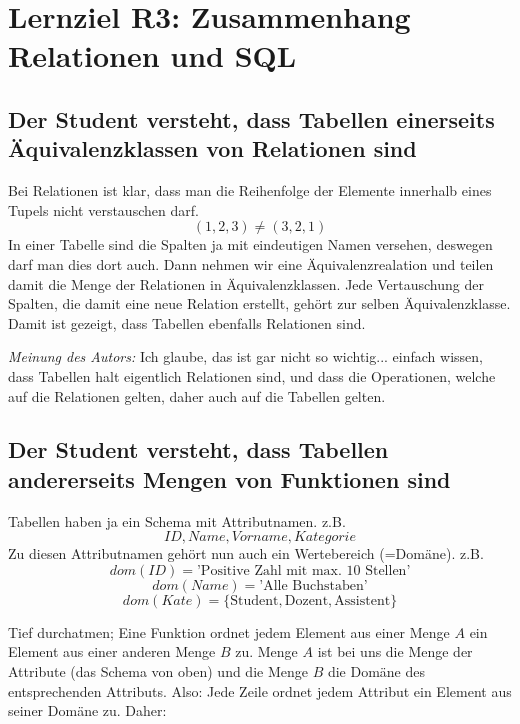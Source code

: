 \section{Lernziel R3: Zusammenhang Relationen und SQL}

\subsection{Der Student versteht, dass Tabellen einerseits Äquivalenzklassen von Relationen sind}
Bei Relationen ist klar, dass man die Reihenfolge der Elemente innerhalb eines Tupels nicht verstauschen darf.
\begin{equation*}
  (1,2,3) \neq (3,2,1)
\end{equation*}
In einer Tabelle sind die Spalten ja mit eindeutigen Namen versehen, deswegen darf man dies dort auch. Dann nehmen wir eine Äquivalenzrealation und teilen damit die Menge der Relationen in Äquivalenzklassen. Jede Vertauschung der Spalten, die damit eine neue Relation erstellt, gehört zur selben Äquivalenzklasse. Damit ist gezeigt, dass Tabellen ebenfalls Relationen sind.

\emph{Meinung des Autors:} Ich glaube, das ist gar nicht so wichtig... einfach wissen, dass Tabellen halt eigentlich Relationen sind, und dass die Operationen, welche auf die Relationen gelten, daher auch auf die Tabellen gelten.
\subsection{Der Student versteht, dass Tabellen andererseits Mengen von Funktionen sind}
Tabellen haben ja ein Schema mit Attributnamen. z.B.
\begin{equation*}
  ID, Name, Vorname, Kategorie
\end{equation*}
Zu diesen Attributnamen gehört nun auch ein Wertebereich (=Domäne). z.B.
\begin{equation*}
  dom(ID) = \text{'Positive Zahl mit max. 10 Stellen'}
\end{equation*}
\begin{equation*}
  dom(Name) = \text{'Alle Buchstaben'}
\end{equation*}
\begin{equation*}
  dom(Kate) = \{\text{Student}, \text{Dozent}, \text{Assistent}\}
\end{equation*}

Tief durchatmen; Eine Funktion ordnet jedem Element aus einer Menge \(A\) ein Element aus einer anderen Menge \(B\) zu. Menge \(A\) ist bei uns die Menge der Attribute (das Schema von oben) und die Menge \(B\) die Domäne des entsprechenden Attributs.
Also: Jede Zeile ordnet jedem Attribut ein Element aus seiner Domäne zu. Daher:

